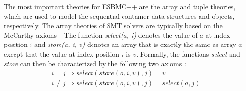 \documentclass[conference]{IEEEtran}
\begin{document}

\smallskip{}
%
The most important theories for ESBMC++ are the array and tuple theories,
which are used to model the sequential container data structures
and objects, respectively.
The array theories of SMT solvers are typically based on the
McCarthy axioms~\cite{McCarthy62}. The function \emph{select(a, i)}
denotes the value of $a$ at index position $i$ and \emph{store(a, i, v)}
denotes an array that is exactly the same as array $a$ except that the
value at index position $i$ is $v$. %
Formally, the functions \emph{select} and \emph{store} can then be characterized
by the following two axioms~\cite{CVC07,Boolector09,Z08}:
%
\[
\begin{array}{l}
  i=j      \Rightarrow select\left(store\left(a,i,v\right),j\right)=v \\
  i \neq j \Rightarrow select\left(store\left(a,i,v\right),j\right)=select\left(a,j\right)
\end{array}
\]
\end{document}
